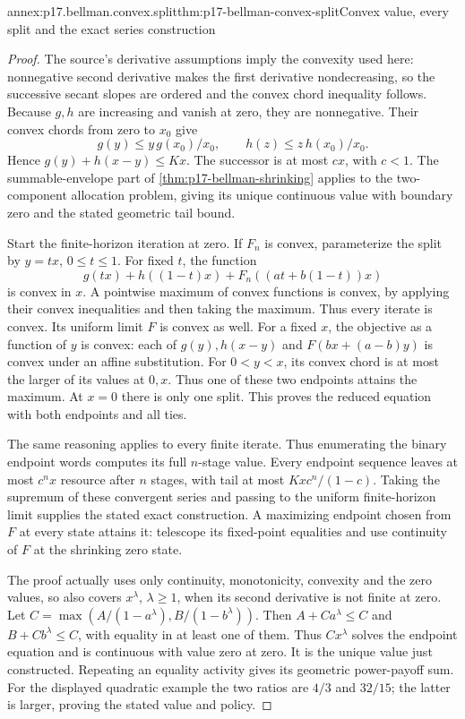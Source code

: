 \begin{annexitem}{annex:p17.bellman.convex.split}{thm:p17-bellman-convex-split}{Convex value, every split and the exact series construction}
\begin{proof}
The source's derivative assumptions
imply the convexity used here: nonnegative
second derivative makes the
first derivative nondecreasing,
so the successive secant
slopes are ordered and the
convex chord inequality follows.
Because \(g,h\) are increasing
and vanish at zero, they are
nonnegative.
Their convex chords from zero
to \(x_0\) give
\[
       g(y)\leq y\,g(x_0)/x_0,\qquad
       h(z)\leq z\,h(x_0)/x_0.
\]
Hence \(g(y)+h(x-y)\leq Kx\).
The successor is at most
\(cx\), with \(c<1\).
The summable-envelope part of
\cref{thm:p17-bellman-shrinking}
applies to the two-component
allocation problem, giving its
unique continuous value with
boundary zero and the stated
geometric tail bound.

Start the finite-horizon
iteration at zero. If \(F_n\)
is convex, parameterize the
split by \(y=tx\),
\(0\leq t\leq1\). For fixed
\(t\), the function
\[
  g(tx)+h((1-t)x)
                 +F_n((at+b(1-t))x)
\]
is convex in \(x\).
A pointwise maximum of convex
functions is convex, by applying
their convex inequalities and
then taking the maximum.
Thus every iterate is convex.
Its uniform limit \(F\) is
convex as well.
For a fixed \(x\), the objective
as a function of \(y\) is convex:
each of \(g(y),h(x-y)\) and
\(F(bx+(a-b)y)\) is convex
under an affine substitution.
For \(0<y<x\), its convex
chord is at most the larger
of its values at \(0,x\).
Thus one of these two endpoints
attains the maximum. At \(x=0\)
there is only one split.
This proves the reduced equation
with both endpoints and all ties.

The same reasoning applies
to every finite iterate.
Thus enumerating the binary
endpoint words computes its
full \(n\)-stage value.
Every endpoint sequence leaves
at most \(c^n x\) resource
after \(n\) stages, with tail
at most \(Kxc^n/(1-c)\).
Taking the supremum of these
convergent series and passing
to the uniform finite-horizon
limit supplies the stated
exact construction.
A maximizing endpoint chosen
from \(F\) at every state
attains it: telescope its
fixed-point equalities and
use continuity of \(F\) at
the shrinking zero state.

The proof actually uses only
continuity, monotonicity,
convexity and the zero values,
so also covers \(x^\lambda\),
\(\lambda\geq1\), when its
second derivative is not
finite at zero.
Let
\(C=\max(A/(1-a^\lambda),
         B/(1-b^\lambda))\).
Then \(A+Ca^\lambda\leq C\)
and \(B+Cb^\lambda\leq C\),
with equality in at least
one of them. Thus \(Cx^\lambda\)
solves the endpoint equation
and is continuous with value
zero at zero. It is the unique
value just constructed.
Repeating an equality activity
gives its geometric power-payoff
sum. For the displayed quadratic
example the two ratios are
\(4/3\) and \(32/15\);
the latter is larger, proving
the stated value and policy.
\end{proof}
\end{annexitem}

